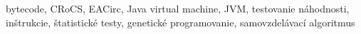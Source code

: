 \documentclass[12pt,twoside]{fithesis2}
\renewcommand{\_}{\leavevmode \kern0.0em\vbox{\hrule width0.4em}}
\begin{document}
\begin{ThesisKeyWords}
bytecode, CRoCS, EACirc, Java virtual machine, JVM, testovanie náhodnosti, inštrukcie, štatistické testy, genetické programovanie, samovzdelávací algoritmus
\end{ThesisKeyWords}



\MainMatter
\tableofcontents








\appendix

\nocite{*}
\printbibliography[title={Bibliografia}]
\end{document}
